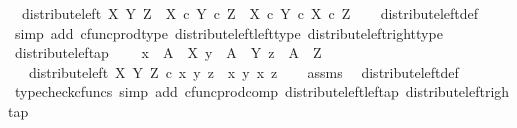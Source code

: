 \begin{isabellebody}
\ \ {\isachardoublequoteopen}distribute{\isacharunderscore}{\kern0pt}left\ X\ Y\ Z\ {\isacharcolon}{\kern0pt}\ X\ {\isasymtimes}\isactrlsub c\ {\isacharparenleft}{\kern0pt}Y\ {\isasymtimes}\isactrlsub c\ Z{\isacharparenright}{\kern0pt}\ {\isasymrightarrow}\ {\isacharparenleft}{\kern0pt}X\ {\isasymtimes}\isactrlsub c\ Y{\isacharparenright}{\kern0pt}\ {\isasymtimes}\isactrlsub c\ {\isacharparenleft}{\kern0pt}X\ {\isasymtimes}\isactrlsub c\ Z{\isacharparenright}{\kern0pt}{\isachardoublequoteclose}\isanewline
%
\isadelimproof
\ \ %
\endisadelimproof
%
\isatagproof
{}\isamarkupfalse%
\ distribute{\isacharunderscore}{\kern0pt}left{\isacharunderscore}{\kern0pt}def\isanewline
\ \ \isamarkupfalse%
\ {\isacharparenleft}{\kern0pt}simp\ add{\isacharcolon}{\kern0pt}\ cfunc{\isacharunderscore}{\kern0pt}prod{\isacharunderscore}{\kern0pt}type\ distribute{\isacharunderscore}{\kern0pt}left{\isacharunderscore}{\kern0pt}left{\isacharunderscore}{\kern0pt}type\ distribute{\isacharunderscore}{\kern0pt}left{\isacharunderscore}{\kern0pt}right{\isacharunderscore}{\kern0pt}type{\isacharparenright}{\kern0pt}%
\endisatagproof
{\isafoldproof}%
%
\isadelimproof
\isanewline
%
\endisadelimproof
\isanewline
{}\isamarkupfalse%
\ distribute{\isacharunderscore}{\kern0pt}left{\isacharunderscore}{\kern0pt}ap{\isacharcolon}{\kern0pt}\ \isanewline
\ \ \ {\isachardoublequoteopen}x\ {\isacharcolon}{\kern0pt}\ A\ {\isasymrightarrow}\ X{\isachardoublequoteclose}\ {\isachardoublequoteopen}y\ {\isacharcolon}{\kern0pt}\ A\ {\isasymrightarrow}\ Y{\isachardoublequoteclose}\ {\isachardoublequoteopen}z\ {\isacharcolon}{\kern0pt}\ A\ {\isasymrightarrow}\ Z{\isachardoublequoteclose}\isanewline
\ \ \ {\isachardoublequoteopen}distribute{\isacharunderscore}{\kern0pt}left\ X\ Y\ Z\ {\isasymcirc}\isactrlsub c\ {\isasymlangle}x{\isacharcomma}{\kern0pt}\ {\isasymlangle}y{\isacharcomma}{\kern0pt}\ z{\isasymrangle}{\isasymrangle}\ {\isacharequal}{\kern0pt}\ {\isasymlangle}{\isasymlangle}x{\isacharcomma}{\kern0pt}\ y{\isasymrangle}{\isacharcomma}{\kern0pt}\ {\isasymlangle}x{\isacharcomma}{\kern0pt}\ z{\isasymrangle}{\isasymrangle}{\isachardoublequoteclose}\isanewline
%
\isadelimproof
\ \ %
\endisadelimproof
%
\isatagproof
{}\isamarkupfalse%
\ assms\ \isamarkupfalse%
\ distribute{\isacharunderscore}{\kern0pt}left{\isacharunderscore}{\kern0pt}def\ \isanewline
\ \ \isamarkupfalse%
\ {\isacharparenleft}{\kern0pt}typecheck{\isacharunderscore}{\kern0pt}cfuncs{\isacharcomma}{\kern0pt}\ simp\ add{\isacharcolon}{\kern0pt}\ cfunc{\isacharunderscore}{\kern0pt}prod{\isacharunderscore}{\kern0pt}comp\ distribute{\isacharunderscore}{\kern0pt}left{\isacharunderscore}{\kern0pt}left{\isacharunderscore}{\kern0pt}ap\ distribute{\isacharunderscore}{\kern0pt}left{\isacharunderscore}{\kern0pt}right{\isacharunderscore}{\kern0pt}ap{\isacharparenright}{\kern0pt}%

\end{isabellebody}
